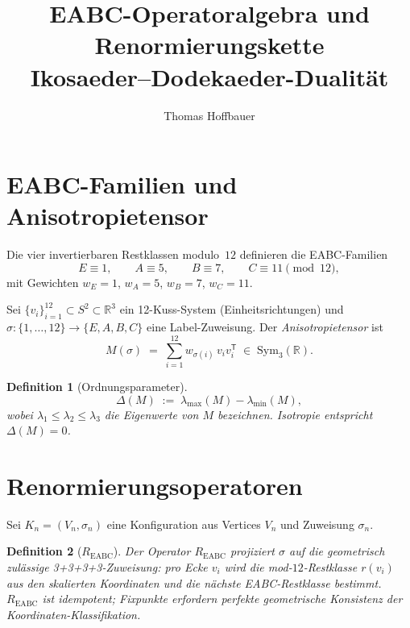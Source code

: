 \documentclass[11pt,a4paper]{article}
\title{EABC-Operatoralgebra und Renormierungskette\\[0.3em]
\large Ikosaeder--Dodekaeder-Dualität}
\author{Thomas Hoffbauer}
\date{}
\newtheorem{definition}{Definition}
\newcommand{\R}{\mathbb{R}}
\begin{document}
\maketitle

\section{EABC-Familien und Anisotropietensor}

Die vier invertierbaren Restklassen modulo~$12$ definieren die EABC-Familien
\[
  E \equiv 1,\qquad A \equiv 5,\qquad B \equiv 7,\qquad C \equiv 11 \pmod{12},
\]
mit Gewichten $w_E=1$, $w_A=5$, $w_B=7$, $w_C=11$.

Sei $\{v_i\}_{i=1}^{12}\subset S^2\subset\R^3$ ein 12-Kuss-System (Einheitsrichtungen)
und $\sigma\colon\{1,\ldots,12\}\to\{E,A,B,C\}$ eine Label-Zuweisung.
Der \emph{Anisotropietensor} ist
\[
  M(\sigma)
  \;=\;
  \sum_{i=1}^{12} w_{\sigma(i)}\, v_i v_i^{\mathsf T}
  \;\in\;
  \mathrm{Sym}_3(\R).
\]

\begin{definition}[Ordnungsparameter]
\[
  \Delta(M) \;:=\; \lambda_{\max}(M) - \lambda_{\min}(M),
\]
wobei $\lambda_1\le\lambda_2\le\lambda_3$ die Eigenwerte von $M$ bezeichnen.
Isotropie entspricht $\Delta(M)=0$.
\end{definition}

\section{Renormierungsoperatoren}

Sei $K_n=(V_n,\sigma_n)$ eine Konfiguration aus Vertices $V_n$ und Zuweisung $\sigma_n$.

\begin{definition}[$R_{\mathrm{EABC}}$]
Der Operator $R_{\mathrm{EABC}}$ projiziert $\sigma$ auf die geometrisch zulässige
3+3+3+3-Zuweisung: pro Ecke $v_i$ wird die mod-$12$-Restklasse
$r(v_i)$ aus den skalierten Koordinaten und die nächste EABC-Restklasse
bestimmt. $R_{\mathrm{EABC}}$ ist idempotent; Fixpunkte erfordern perfekte
geometrische Konsistenz der Koordinaten-Klassifikation.
\end{definition}
\end{document}
